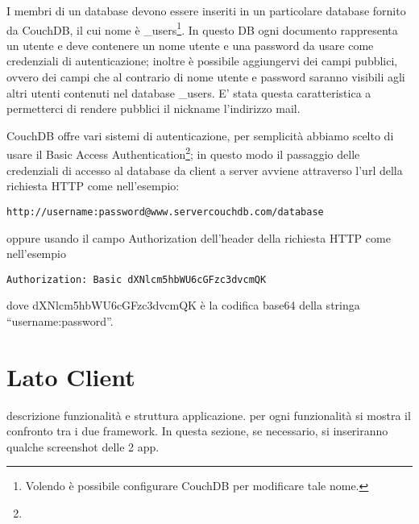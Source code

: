 		I membri di un database devono essere inseriti in un particolare database 
		fornito da CouchDB, il cui nome è _users\footnote{Volendo è possibile 
		configurare CouchDB per modificare tale nome.}. In questo DB ogni documento 
		rappresenta un utente e deve contenere un nome utente e una password da 
		usare come credenziali di autenticazione; inoltre è possibile aggiungervi 
		dei campi pubblici, ovvero dei campi che al contrario di nome utente e 
		password saranno visibili agli altri utenti contenuti nel database _users.
		E' stata questa caratteristica a permetterci di rendere pubblici il nickname 
		l'indirizzo mail.
		
		CouchDB offre vari sistemi di autenticazione, per semplicità abbiamo scelto 
		di usare il Basic Access Authentication\footnote{}; in questo modo il passaggio delle 
		credenziali di accesso al database da client a server avviene attraverso 
		l'url della richiesta HTTP come nell'esempio: 
		\begin{lstlisting}[language=HTTP]
		http://username:password@www.servercouchdb.com/database
		\end{lstlisting}
		oppure usando il campo Authorization dell'header della richiesta HTTP 
		come nell'esempio 
		\begin{lstlisting}[language=HTTP]
		Authorization: Basic dXNlcm5hbWU6cGFzc3dvcmQK
		\end{lstlisting}
		dove dXNlcm5hbWU6cGFzc3dvcmQK è la codifica base64 della stringa 
		``username:password''.
		
		
	\section{Lato Client}
		descrizione funzionalità e struttura applicazione. per ogni funzionalità
		si mostra il confronto tra i due framework. In questa sezione, se 
		necessario, si inseriranno qualche screenshot delle 2 app.
